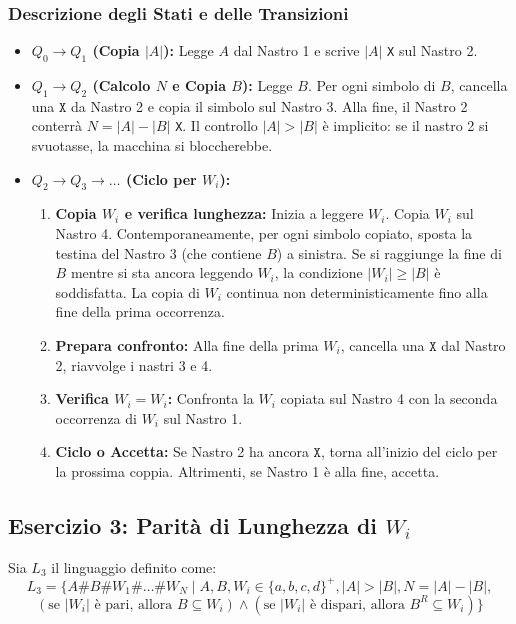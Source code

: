\documentclass[a4paper]{article}
\theoremstyle{definition} %
\newcommand{\Sh}{\texttt{\#}} %
\newcommand{\X}{\texttt{X}} %
\begin{document}
\subsubsection{Descrizione degli Stati e delle Transizioni}
\begin{itemize}
    \item \textbf{$Q_0 \to Q_1$ (Copia $|A|$):} Legge $A$ dal Nastro 1 e scrive $|A|$ \texttt{X} sul Nastro 2.
    \item \textbf{$Q_1 \to Q_2$ (Calcolo $N$ e Copia $B$):} Legge $B$. Per ogni simbolo di $B$, cancella una $\X$ da Nastro 2 e copia il simbolo sul Nastro 3. Alla fine, il Nastro 2 conterrà $N=|A|-|B|$ \texttt{X}. Il controllo $|A|>|B|$ è implicito: se il nastro 2 si svuotasse, la macchina si bloccherebbe.
    \item \textbf{$Q_2 \to Q_3 \to \dots$ (Ciclo per $W_i$):}
    \begin{enumerate}
        \item \textbf{Copia $W_i$ e verifica lunghezza:} Inizia a leggere $W_i$. Copia $W_i$ sul Nastro 4. Contemporaneamente, per ogni simbolo copiato, sposta la testina del Nastro 3 (che contiene $B$) a sinistra. Se si raggiunge la fine di $B$ mentre si sta ancora leggendo $W_i$, la condizione $|W_i| \ge |B|$ è soddisfatta. La copia di $W_i$ continua non deterministicamente fino alla fine della prima occorrenza.
        \item \textbf{Prepara confronto:} Alla fine della prima $W_i$, cancella una $\X$ dal Nastro 2, riavvolge i nastri 3 e 4.
        \item \textbf{Verifica $W_i=W_i$:} Confronta la $W_i$ copiata sul Nastro 4 con la seconda occorrenza di $W_i$ sul Nastro 1.
        \item \textbf{Ciclo o Accetta:} Se Nastro 2 ha ancora $\X$, torna all'inizio del ciclo per la prossima coppia. Altrimenti, se Nastro 1 è alla fine, accetta.
    \end{enumerate}
\end{itemize}


\subsection{Esercizio 3: Parità di Lunghezza di $W_i$}

Sia $L_3$ il linguaggio definito come:
\[
L_3 = \{A\Sh B\Sh W_1 \Sh \dots \Sh W_N \mid A, B, W_i \in \{a,b,c,d\}^+, |A| > |B|, N = |A| - |B|, 
\]
$\qquad (\text{se } |W_i| \text{ è pari, allora } B \subseteq W_i) \land (\text{se } |W_i| \text{ è dispari, allora } B^R \subseteq W_i) \}$
\end{document}
